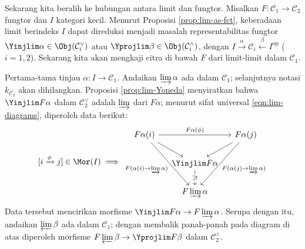 Sekarang kita beralih ke hubungan antara limit dan fungtor. Misalkan $F: \mathcal{C}_1 \to \mathcal{C}_2$ fungtor dan $I$ kategori kecil. Menurut Proposisi \ref{prop:lim-as-fct}, keberadaan limit berindeks $I$ dapat direduksi menjadi masalah representabilitas fungtor $\Yinjlim \alpha \in \Obj(\mathcal{C}_i^\vee)$ atau $\Yprojlim \beta \in \Obj(\mathcal{C}_i^\wedge)$, dengan $I \xrightarrow{\alpha} \mathcal{C}_i \xleftarrow{\beta} I^\text{op}$ ($i=1,2$). Sekarang kita akan mengkaji citra di bawah $F$ dari limit-limit dalam $\mathcal{C}_1$.

Pertama-tama tinjau $\alpha: I \to \mathcal{C}_1$. Andaikan $\varinjlim \alpha$ ada dalam $\mathcal{C}_1$; selanjutnya notasi $k_{\mathcal{C}_2}$ akan dihilangkan. Proposisi \ref{prop:lim-Yoneda} menyiratkan bahwa $\Yinjlim F\alpha$ dalam $\mathcal{C}_2^\vee$ adalah $\varinjlim$ dari $F\alpha$; menurut sifat universal \eqref{eqn:lim-diagrams}, diperoleh data berikut:
\[
	[i \xrightarrow{\phi} j] \in \Mor(I) \implies \begin{tikzcd}[column sep=small]
	F\alpha(i) \arrow[rd] \arrow[rdd, "F(\alpha(i) \to \varinjlim \alpha)"'] \arrow[rr, "F\alpha(\phi)"] & & F\alpha(j) \arrow[ld] \arrow[ldd, "F(\alpha(j) \to \varinjlim \alpha)"] \\
	& \Yinjlim F\alpha \arrow[d, "\exists !" description] & \\
	& F\varinjlim\alpha &
\end{tikzcd} \]
Data tersebut mencirikan morfisme $\Yinjlim F\alpha \to F\varinjlim \alpha$. Serupa dengan itu, andaikan $\varprojlim \beta$ ada dalam $\mathcal{C}_1$; dengan membalik panah-panah pada diagram di atas diperoleh morfisme $F\varprojlim \beta \to \Yprojlim F\beta$ dalam $\mathcal{C}_2^\wedge$.

%

